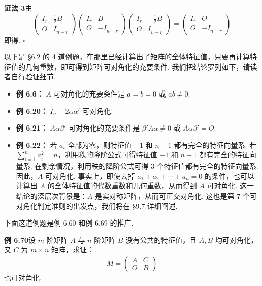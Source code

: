 \documentclass[UTF8, 12pt, fontset=fandol, oneside]{ctexart}
\begin{document}
\noindent\textbf{证法 3}\quad 由
\[
\left(\begin{array}{cc}
I_r & \frac{1}{2}B\\
O & I_{n-r}
\end{array}\right)
\left(\begin{array}{cc}
I_r & B\\
O & -I_{n-r}
\end{array}\right)
\left(\begin{array}{cc}
I_r & -\frac{1}{2}B\\
O & I_{n-r}
\end{array}\right)
=\left(\begin{array}{cc}
I_r & O\\
O & -I_{n-r}
\end{array}\right)
\]
即得. $\square$

以下是 §6.2 的 4 道例题，在那里已经计算出了矩阵的全体特征值，只要再计算特征值的几何重数，即可得到矩阵可对角化的充要条件. 我们把结论罗列如下，请读者自行验证细节.

\begin{itemize}
\item \noindent\textbf{例 6.6：} $A$ 可对角化的充要条件是 $a=b=0$ 或 $ab\ne 0$.
\item \noindent\textbf{例 6.20：} $I_n-2\alpha\alpha'$ 可对角化.
\item \noindent\textbf{例 6.21：} $A\alpha\beta'$ 可对角化的充要条件是 $\beta'A\alpha\ne 0$ 或 $A\alpha\beta'=O$.
\item \noindent\textbf{例 6.22：} 若 $a_i$ 全部为零，则特征值 $-1$ 和 $n-1$ 都有完全的特征向量系. 若 $\sum_{i=1}^n a_i^2=n$，利用秩的降阶公式可得特征值 $-1$ 和 $n-1$ 都有完全的特征向量系. 在剩余情况，利用秩的降阶公式可得 3 个特征值都有完全的特征向量系. 因此，$A$ 可对角化. 事实上，即使去掉 $a_1+a_2+\cdots+a_n=0$ 的条件，也可以计算出 $A$ 的全体特征值的代数重数和几何重数，从而得到 $A$ 可对角化. 这一结论的深层次背景是：$A$ 是实对称矩阵，从而可正交对角化. 这也是第 7 个可对角化判定准则的出发点，我们将在 §9.7 详细阐述.
\end{itemize}

下面这道例题是例 6.60 和例 6.69 的推广.

\noindent\textbf{例 6.70}\quad 设 $m$ 阶矩阵 $A$ 与 $n$ 阶矩阵 $B$ 没有公共的特征值，且 $A,B$ 均可对角化，又 $C$ 为 $m\times n$ 矩阵，求证：
\[
M=\left(\begin{array}{cc}
A & C\\
O & B
\end{array}\right)
\]
也可对角化.
\end{document}
